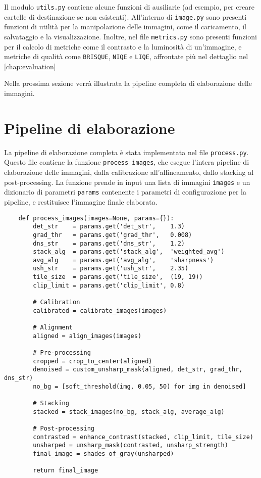 Il modulo \texttt{utils.py} contiene alcune funzioni di ausiliarie (ad esempio, per creare cartelle di destinazione se non esistenti). All'interno di \texttt{image.py} sono presenti funzioni di utilità per la manipolazione delle immagini, come il caricamento, il salvataggio e la visualizzazione. Inoltre, nel file \texttt{metrics.py} sono presenti funzioni per il calcolo di metriche come il contrasto e la luminosità di un'immagine, e metriche di qualità come \texttt{BRISQUE}, \texttt{NIQE} e \texttt{LIQE}, affrontate più nel dettaglio nel \cref{chap:evaluation}

Nella prossima sezione verrà illustrata la pipeline completa di elaborazione delle immagini.

\section{Pipeline di elaborazione} \label{sec:pipeline_impl}

La pipeline di elaborazione completa è stata implementata nel file \texttt{process.py}. Questo file contiene la funzione \texttt{process\_images}, che esegue l'intera pipeline di elaborazione delle immagini, dalla calibrazione all'allineamento, dallo stacking al post-processing. La funzione prende in input una lista di immagini \texttt{images} e un dizionario di parametri \texttt{params} contenente i parametri di configurazione per la pipeline, e restituisce l'immagine finale elaborata.

\begin{lstlisting}
    def process_images(images=None, params={}):
        det_str    = params.get('det_str',    1.3)
        grad_thr   = params.get('grad_thr',   0.008)
        dns_str    = params.get('dns_str',    1.2)
        stack_alg  = params.get('stack_alg',  'weighted_avg')
        avg_alg    = params.get('avg_alg',    'sharpness')
        ush_str    = params.get('ush_str',    2.35)
        tile_size  = params.get('tile_size',  (19, 19))
        clip_limit = params.get('clip_limit', 0.8)

        # Calibration
        calibrated = calibrate_images(images)

        # Alignment 
        aligned = align_images(images)

        # Pre-processing
        cropped = crop_to_center(aligned)
        denoised = custom_unsharp_mask(aligned, det_str, grad_thr, dns_str)
        no_bg = [soft_threshold(img, 0.05, 50) for img in denoised]

        # Stacking
        stacked = stack_images(no_bg, stack_alg, average_alg)

        # Post-processing
        contrasted = enhance_contrast(stacked, clip_limit, tile_size)
        unsharped = unsharp_mask(contrasted, unsharp_strength)
        final_image = shades_of_gray(unsharped)
        
        return final_image
\end{lstlisting}

